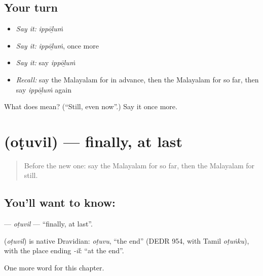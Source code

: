 \subsection*{Your turn}
\begin{itemize}
\raggedright
  \item \emph{Say it:} \emph{ippōḻuṁ}
  \item \emph{Say it:} \emph{ippōḻuṁ}, once more
  \item \emph{Say it:} say \emph{ippōḻuṁ}
  \item \emph{Recall:} say the Malayalam for in advance, then the Malayalam for so far, then say \emph{ippōḻuṁ} again
\end{itemize}

\begin{tcolorbox}[breakable,colback=teal!4,colframe=teal!35!black,title={Before you move on}]
What does  mean? (\textquotedblleft{}Still, even now\textquotedblright{}.) Say it once more.
\end{tcolorbox}
\section[\texorpdfstring{\ml{ഒടുവിൽ} (oṭuvil)}{ഒടുവിൽ (oṭuvil)}]{ (oṭuvil) — finally, at last}

\label{lesson:ML-C196-otuvil}



\begin{quote}
Before the new one: say the Malayalam for so far, then the Malayalam for still.
\end{quote}

\subsection*{You'll want to know: }
\textbf{} — \emph{oṭuvil} — \textquotedblleft{}finally, at last\textquotedblright{}.

\begin{cousinweb}
\textbf{} (\emph{oṭuvil}) is native Dravidian: \emph{oṭuvu}, \textquotedblleft{}the end\textquotedblright{} (DEDR 954, with Tamil \emph{oṭuṅku}), with the place ending \emph{-il}: \textquotedblleft{}at the end\textquotedblright{}.
\end{cousinweb}

\begin{grammarlens}[title={What you've built}]
One more word for this chapter.
\end{grammarlens}

